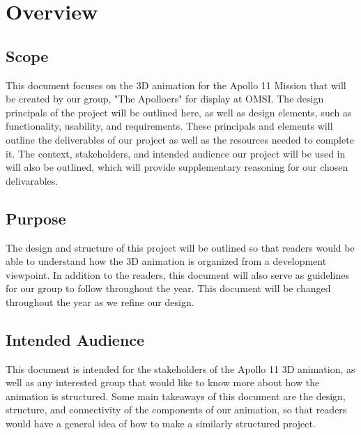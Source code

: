 \documentclass[onecolumn, draftclsnofoot,10pt, compsoc]{IEEEtran}
\begin{document}
\clearpage


\section{Overview}
       \subsection{Scope}
        This document focuses on the 3D animation for the Apollo 11 Mission that will be created by our group, "The Apolloers" for display at OMSI. The design principals of the project will be outlined here, as well as design elements, such as functionality, usability, and requirements. These principals and elements will outline the deliverables of our project as well as the resources needed to complete it. The context, stakeholders, and intended audience our project will be used in will also be outlined, which will provide supplementary reasoning for our chosen delivarables.  %
        
    \subsection{Purpose}
        The design and structure of this project will be outlined so that readers would be able to understand how the 3D animation is organized from a development viewpoint. In addition to the readers, this document will also serve as guidelines for our group to follow throughout the year. This document will be changed throughout the year as we refine our design. 

    \subsection{Intended Audience}
        This document is intended for the stakeholders of the Apollo 11 3D animation, as well as any interested group that would like to know more about how the animation is structured. Some main takeaways of this document are the design, structure, and connectivity of the components of our animation, so that readers would have a general idea of how to make a similarly structured project. 
\end{document}
